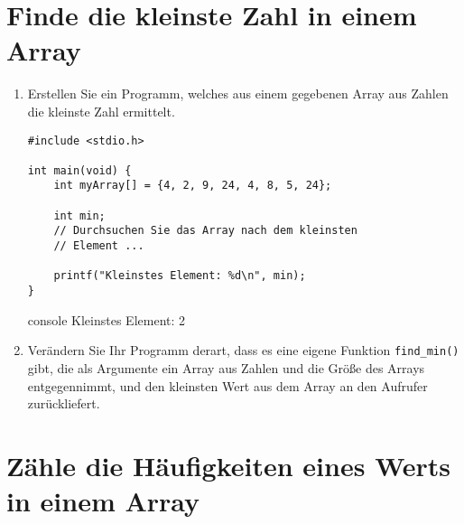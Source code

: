 \chapter{Finde die kleinste Zahl in einem Array}


\begin{enumerate}
  \item Erstellen Sie ein Programm, welches aus einem gegebenen Array aus
  Zahlen die kleinste Zahl ermittelt.

\Vorlage
\begin{verbatim}
#include <stdio.h>

int main(void) {
    int myArray[] = {4, 2, 9, 24, 4, 8, 5, 24};

    int min;
    // Durchsuchen Sie das Array nach dem kleinsten
    // Element ...

    printf("Kleinstes Element: %d\n", min);
}
\end{verbatim}

\begin{mybox}[Bildschirmausgabe]{console}
Kleinstes Element: 2
\end{mybox}

\item Verändern Sie Ihr Programm derart, dass es eine eigene Funktion
\texttt{find_min()} gibt, die als Argumente ein Array aus Zahlen und die
Größe des Arrays entgegennimmt, und den kleinsten Wert aus dem Array an den
Aufrufer zurückliefert.
\end{enumerate}




\chapter{Zähle die Häufigkeiten eines Werts in einem Array}


